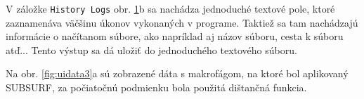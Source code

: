 \documentclass[a4paper,11pt,oneside]{article}%
\begin{document}
\begin{figure}[H]%
    \centering
    \qquad
    \caption{}%
    \label{fig:uidata2}%
\end{figure}

V záložke \texttt{History Logs} obr. \ref{fig:uidata2}b sa nachádza jednoduché textové pole, ktoré zaznamenáva väčšinu úkonov vykonaných v programe. Taktiež sa tam nachádzajú informácie o načítanom súbore, ako napríklad aj názov súboru, cesta k súboru atď... Tento výstup sa dá uložiť do jednoduchého textového súboru.

Na obr. \ref{fig:uidata3}a sú zobrazené dáta s makrofágom, na ktoré bol aplikovaný SUBSURF, za počiatočnú podmienku bola použitá dištančná funkcia.
\end{document}
